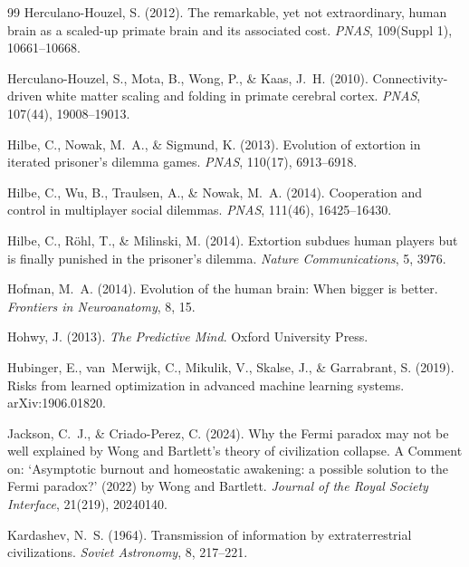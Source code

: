 \documentclass[11pt,a4paper,twocolumn]{article}
\begin{document}
\begin{thebibliography}{99}
 Herculano-Houzel, S. (2012). The remarkable, yet not extraordinary, human brain as a scaled-up primate brain and its associated cost. \textit{PNAS}, 109(Suppl 1), 10661--10668.

 Herculano-Houzel, S., Mota, B., Wong, P., \& Kaas, J.~H. (2010). Connectivity-driven white matter scaling and folding in primate cerebral cortex. \textit{PNAS}, 107(44), 19008--19013.

 Hilbe, C., Nowak, M.~A., \& Sigmund, K. (2013). Evolution of extortion in iterated prisoner's dilemma games. \textit{PNAS}, 110(17), 6913--6918.

 Hilbe, C., Wu, B., Traulsen, A., \& Nowak, M.~A. (2014). Cooperation and control in multiplayer social dilemmas. \textit{PNAS}, 111(46), 16425--16430.

 Hilbe, C., R\"ohl, T., \& Milinski, M. (2014). Extortion subdues human players but is finally punished in the prisoner's dilemma. \textit{Nature Communications}, 5, 3976.

 Hofman, M.~A. (2014). Evolution of the human brain: When bigger is better. \textit{Frontiers in Neuroanatomy}, 8, 15.

 Hohwy, J. (2013). \textit{The Predictive Mind}. Oxford University Press.

 Hubinger, E., van~Merwijk, C., Mikulik, V., Skalse, J., \& Garrabrant, S. (2019). Risks from learned optimization in advanced machine learning systems. arXiv:1906.01820.

 Jackson, C.~J., \& Criado-Perez, C. (2024). Why the Fermi paradox may not be well explained by Wong and Bartlett's theory of civilization collapse. A Comment on: `Asymptotic burnout and homeostatic awakening: a possible solution to the Fermi paradox?' (2022) by Wong and Bartlett. \textit{Journal of the Royal Society Interface}, 21(219), 20240140.

 Kardashev, N.~S. (1964). Transmission of information by extraterrestrial civilizations. \textit{Soviet Astronomy}, 8, 217--221.


\end{thebibliography}
\end{document}
